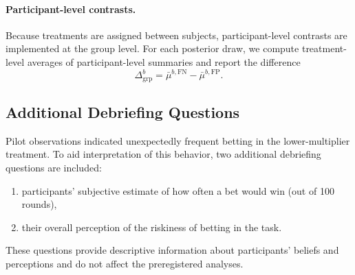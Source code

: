 \documentclass[11pt,a4paper]{article}
\numberwithin{equation}{section}
\begin{document}
\paragraph{Participant-level contrasts.}

Because treatments are assigned between subjects, participant-level
contrasts are implemented at the group level. For each posterior draw,
we compute treatment-level averages of participant-level summaries and
report the difference
\[
\Delta_{\mathrm{grp}}^{b} =
\bar{\mu}^{b,\mathrm{FN}} -
\bar{\mu}^{b,\mathrm{FP}}.
\]

\subsection{Additional Debriefing Questions}

Pilot observations indicated unexpectedly frequent betting in the
lower-multiplier treatment. To aid interpretation of this behavior,
two additional debriefing questions are included:

\begin{enumerate}
	\item participants’ subjective estimate of how often a bet would win
	(out of 100 rounds),
	\item their overall perception of the riskiness of betting in the task.
\end{enumerate}

These questions provide descriptive information about participants’
beliefs and perceptions and do not affect the preregistered analyses.
\end{document}
